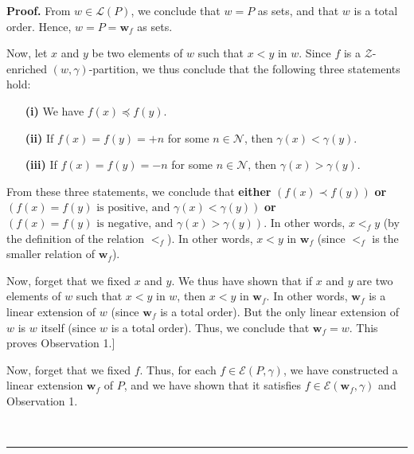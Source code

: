 \documentclass[numbers=enddot,12pt,final,onecolumn,notitlepage]{scrartcl}%
\theoremstyle{definition}
\newenvironment{proof}[1][Proof]{\noindent\textbf{#1.} }{\ \rule{0.5em}{0.5em}}
\newenvironment{verlong}{}{}
\begin{document}
\begin{verlong}
\begin{proof}
From $w \in \mathcal{L} \left( P \right)$, we conclude that $w = P$
as sets, and that $w$ is a total order.
Hence, $w = P = \mathbf{w}_f$ as sets.

Now, let $x$ and $y$ be two elements of $w$ such that $x<y$ in $w$. Since $f$
is a $\mathcal{Z}$-enriched $\left(  w,\gamma\right)  $-partition, we thus
conclude that the following three statements hold:

\begin{enumerate}
\item[\textbf{(i)}] We have $f\left(  x\right)  \preccurlyeq f\left(
y\right)  $.

\item[\textbf{(ii)}] If $f\left(  x\right)  =f\left(  y\right)  =+n$ for some
$n\in\mathcal{N}$, then $\gamma\left(  x\right)  <\gamma\left(  y\right)  $.

\item[\textbf{(iii)}] If $f\left(  x\right)  =f\left(  y\right)  =-n$ for some
$n\in\mathcal{N}$, then $\gamma\left(  x\right)  >\gamma\left(  y\right)  $.
\end{enumerate}

From these three statements, we conclude that \textbf{either} $\left(
f\left(  x\right)  \prec f\left(  y\right)  \right)  $ \newline
\textbf{or} $\left(
f\left(  x\right)  =f\left(  y\right)  \text{ is positive, and }\gamma\left(
x\right)  <\gamma\left(  y\right)  \right)  $ \newline
\textbf{or} $\left(  f\left(
x\right)  =f\left(  y\right)  \text{ is negative, and }\gamma\left(  x\right)
>\gamma\left(  y\right)  \right)  $. In other words, $x<_{f}y$ (by the
definition of the relation $<_{f}$). In other words, $x<y$ in $\mathbf{w}_{f}$
(since $<_{f}$ is the smaller relation of $\mathbf{w}_{f}$).

Now, forget that we fixed $x$ and $y$. We thus have shown that if $x$ and $y$
are two elements of $w$ such that $x<y$ in $w$, then $x<y$ in $\mathbf{w}_{f}%
$. In other words, $\mathbf{w}_{f}$ is a linear extension of $w$ (since
$\mathbf{w}_{f}$ is a total order). But the only linear extension of $w$ is
$w$ itself (since $w$ is a total order). Thus, we conclude that $\mathbf{w}%
_{f}=w$. This proves Observation 1.]

Now, forget that we fixed $f$. Thus, for each $f\in\mathcal{E}\left(
P,\gamma\right)  $, we have constructed a linear extension $\mathbf{w}_{f}$ of
$P$, and we have shown that it satisfies $f\in\mathcal{E}\left(
\mathbf{w}_{f},\gamma\right)  $ and Observation 1.


\end{proof}
\end{verlong}
\end{document}
